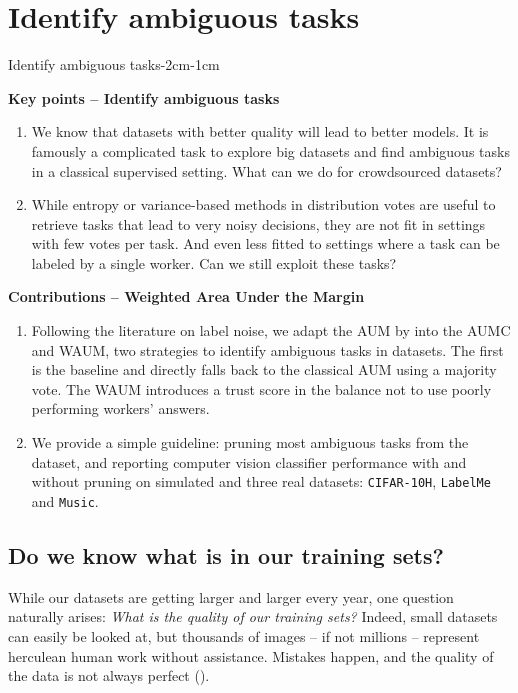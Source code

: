 \chapter{Identify ambiguous tasks}
\label{chap:waum}

\enlargethispage{3\baselineskip}

\begin{keypointstwomargins}{Identify ambiguous tasks}{-2cm}{-1cm}

        \textbf{Key points -- Identify ambiguous tasks}
        \begin{enumerate}[leftmargin=*]
        \item We know that datasets with better quality will lead to better models. It is famously a complicated task to explore big datasets and find ambiguous tasks in a classical supervised setting. What can we do for crowdsourced datasets?
        \item While entropy or variance-based methods in distribution votes are useful to retrieve tasks that lead to very noisy decisions, they are not fit in settings with few votes per task. And even less fitted to settings where a task can be labeled by a single worker. Can we still exploit these tasks?
        \end{enumerate}

        \textbf{Contributions -- Weighted Area Under the Margin}
        \begin{enumerate}[leftmargin=*,start=3]
        \item Following the literature on label noise, we adapt the AUM by \citet{pleiss_identifying_2020} into the AUMC and WAUM, two strategies to identify ambiguous tasks in datasets. The first is the baseline and directly falls back to the classical AUM using a majority vote. The WAUM introduces a trust score in the balance not to use poorly performing workers' answers.
        \item We provide a simple guideline: pruning most ambiguous tasks from the dataset, and reporting computer vision classifier performance with and without pruning on simulated and three real datasets: \texttt{CIFAR-10H}, \texttt{LabelMe} and \texttt{Music}.
        \end{enumerate}

\end{keypointstwomargins}

\section{Do we know what is in our training sets?}
While our datasets are getting larger and larger every year, one question naturally arises: \emph{What is the quality of our training sets?}
Indeed, small datasets can easily be looked at, but thousands of images -- if not millions -- represent herculean human work without assistance.
Mistakes happen, and the quality of the data is not always perfect ().

